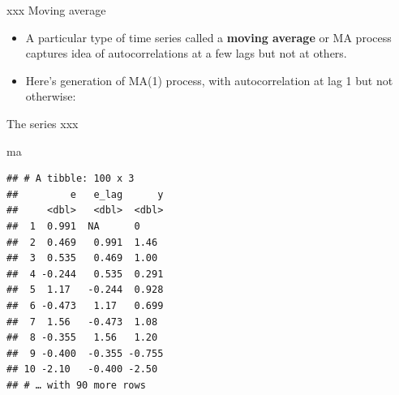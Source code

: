 \documentclass[ignorenonframetext,]{beamer}
\newenvironment{Shaded}{\begin{snugshade}}{\end{snugshade}}
\newcommand{\DataTypeTok}[1]{\textcolor[rgb]{0.13,0.29,0.53}{#1}}
\newcommand{\DecValTok}[1]{\textcolor[rgb]{0.00,0.00,0.81}{#1}}
\newcommand{\KeywordTok}[1]{\textcolor[rgb]{0.13,0.29,0.53}{\textbf{#1}}}
\newcommand{\NormalTok}[1]{#1}
\newcommand{\OperatorTok}[1]{\textcolor[rgb]{0.81,0.36,0.00}{\textbf{#1}}}
\newcommand{\StringTok}[1]{\textcolor[rgb]{0.31,0.60,0.02}{#1}}
\begin{document}
\begin{frame}[fragile]{xxx Moving average}
\protect\hypertarget{xxx-moving-average}{}

\begin{itemize}
\item
  A particular type of time series called a \textbf{moving average} or
  MA process captures idea of autocorrelations at a few lags but not at
  others.
\item
  Here's generation of MA(1) process, with autocorrelation at lag 1 but
  not otherwise:
\end{itemize}

\begin{Shaded}
\end{Shaded}

\end{frame}

\begin{frame}[fragile]{The series xxx}
\protect\hypertarget{the-series-xxx}{}

\begin{Shaded}
\begin{Highlighting}[]
\NormalTok{ma}
\end{Highlighting}
\end{Shaded}

\begin{verbatim}
## # A tibble: 100 x 3
##         e   e_lag      y
##     <dbl>   <dbl>  <dbl>
##  1  0.991  NA      0    
##  2  0.469   0.991  1.46 
##  3  0.535   0.469  1.00 
##  4 -0.244   0.535  0.291
##  5  1.17   -0.244  0.928
##  6 -0.473   1.17   0.699
##  7  1.56   -0.473  1.08 
##  8 -0.355   1.56   1.20 
##  9 -0.400  -0.355 -0.755
## 10 -2.10   -0.400 -2.50 
## # … with 90 more rows
\end{verbatim}

\end{frame}
\end{document}
